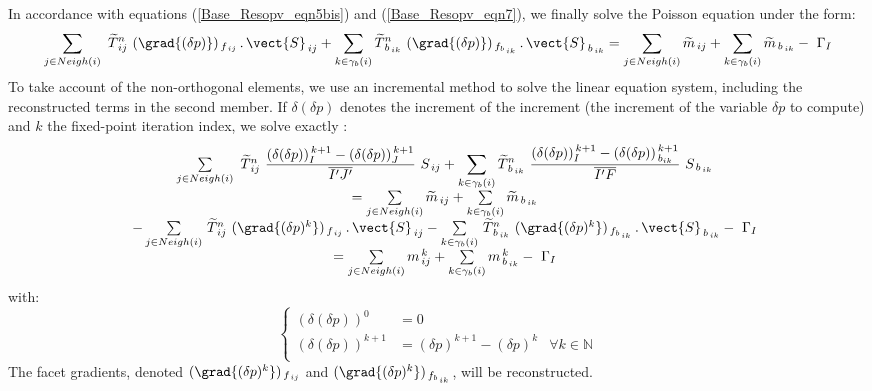 In accordance with equations (\ref{Base_Resopv_eqn5bis}) and (\ref{Base_Resopv_eqn7}), we finally solve the Poisson equation under the form:
\begin{equation}
\sum\limits_{j\in Neigh(i)}\ \widetilde{T}^n_{\,ij}\ (\grad{(\delta p)})_{\,f_{\,ij}}\,.\,\vect{S}_{\,ij} + \sum\limits_{k\in {\gamma_b(i)}}\widetilde{T}^n_{\,b_{\,ik}}\ (\grad{(\delta p)})_{\,f_{b_{\,ik}}}\,.\,\vect{S}_{\,b_{\,ik}} = \sum\limits_{j\in Neigh(i)} \widetilde{m}_{\,ij} + \sum\limits_{k\in {\gamma_b(i)}}\widetilde{m}_{\,b_{\,ik}} -\ \Gamma_I
\label{Base_Resopv_Poisson}
\end{equation}
To take account of the non-orthogonal elements, we use an incremental method to solve the linear equation system, including the reconstructed terms in the second member. If $\delta(\delta p)$ denotes the increment of the increment (the increment of the variable $\delta p$ to compute) and $k$ the fixed-point iteration index, we solve exactly :
\begin{equation}
\begin{array}{lcl}
&\sum\limits_{j\in Neigh(i)}\ \widetilde{T}^n_{\,ij}\ \displaystyle \frac{(\delta(\delta p))_I^{\,k+1}-(\delta(\delta p))_J^{\,k+1}}{\overline{I'J'}}\ S_{\,ij} + \sum\limits_{k\in {\gamma_b(i)}}\widetilde{T}^n_{\,b_{\,ik}}\ \displaystyle\frac{(\delta(\delta p))_I^{\,k+1}-(\delta(\delta p))_{\,b_{ik}}^{\,k+1}}{\overline{I'F}}\ S_{\,b_{\,ik}} \\
&= \sum\limits_{j\in Neigh(i)} \widetilde{m}_{\,ij} + \sum\limits_{k\in {\gamma_b(i)}}\widetilde{m}_{\,b_{\,ik}}\\
& - \sum\limits_{j\in Neigh(i)}\,\widetilde{T}^n_{\,ij}\ (\grad{(\delta{p})^k})_{\,f_{\,ij}}\,.\,\vect{S}_{\,ij} - \sum\limits_{k\in {\gamma_b(i)}}\,\widetilde{T}^n_{\,b_{\,ik}}\ (\grad{(\delta{p})^k})_{\,f_{b_{\,ik}}}\,.\,\vect{S}_{\,b_{\,ik}}
- \ \Gamma_I\\
&= \sum\limits_{j\in Neigh(i)} m^{\,k}_{\,ij} + \sum\limits_{k\in {\gamma_b(i)}}m^{\,k}_{\,b_{\,ik}} - \ \Gamma_I
\end{array}
\label{Base_Resopv_equation resolue}
\end{equation}
with:
\begin{equation}\label{Base_Resopv_increment}
\left\{\begin{array}{lll}
(\delta(\delta p))^{0} &= 0\\
(\delta(\delta p))^{k+1} &= (\delta p)^{k+1}-(\delta p)^k &\text {$\forall k \in \mathbb{N}$}\\
\end{array}\right.
\end{equation}
The facet gradients, denoted $(\grad{(\delta{p})^k})_{\,f_{\,ij}}$ and $(\grad{(\delta{p})^k})_{\,f_{b_{\,ik}}}$, will be reconstructed.

